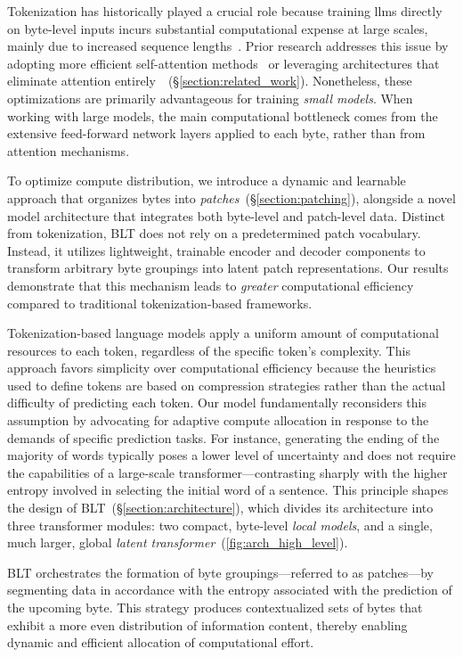 Tokenization has historically played a crucial role because training llms directly on byte-level inputs incurs substantial computational expense at large scales, mainly due to increased sequence lengths~\citep{xue2022byt5}. Prior research addresses this issue by adopting more efficient self-attention methods~\citep{el2020characterbert, clark2022canine} or leveraging architectures that eliminate attention entirely~\citep{wang2024mambabyte}~(\S\ref{section:related_work}). Nonetheless, these optimizations are primarily advantageous for training \textit{small models}. When working with large models, the main computational bottleneck comes from the extensive feed-forward network layers applied to each byte, rather than from attention mechanisms.

To optimize compute distribution, we introduce a dynamic and learnable approach that organizes bytes into \textit{patches}~(\S\ref{section:patching}), alongside a novel model architecture that integrates both byte-level and patch-level data. Distinct from tokenization, {\textsc BLT} does not rely on a predetermined patch vocabulary. Instead, it utilizes lightweight, trainable encoder and decoder components to transform arbitrary byte groupings into latent patch representations. Our results demonstrate that this mechanism leads to \textit{greater} computational efficiency compared to traditional tokenization-based frameworks.

Tokenization-based language models apply a uniform amount of computational resources to each token, regardless of the specific token’s complexity. This approach favors simplicity over computational efficiency because the heuristics used to define tokens are based on compression strategies rather than the actual difficulty of predicting each token. Our model fundamentally reconsiders this assumption by advocating for adaptive compute allocation in response to the demands of specific prediction tasks. For instance, generating the ending of the majority of words typically poses a lower level of uncertainty and does not require the capabilities of a large-scale transformer—contrasting sharply with the higher entropy involved in selecting the initial word of a sentence. This principle shapes the design of {\textsc BLT}~(\S\ref{section:architecture}), which divides its architecture into three transformer modules: two compact, byte-level \textit{local models}, and a single, much larger, global \textit{latent transformer}~(\autoref{fig:arch_high_level}). 

{\textsc BLT} orchestrates the formation of byte groupings—referred to as patches—by segmenting data in accordance with the entropy associated with the prediction of the upcoming byte. This strategy produces contextualized sets of bytes that exhibit a more even distribution of information content, thereby enabling dynamic and efficient allocation of computational effort.

